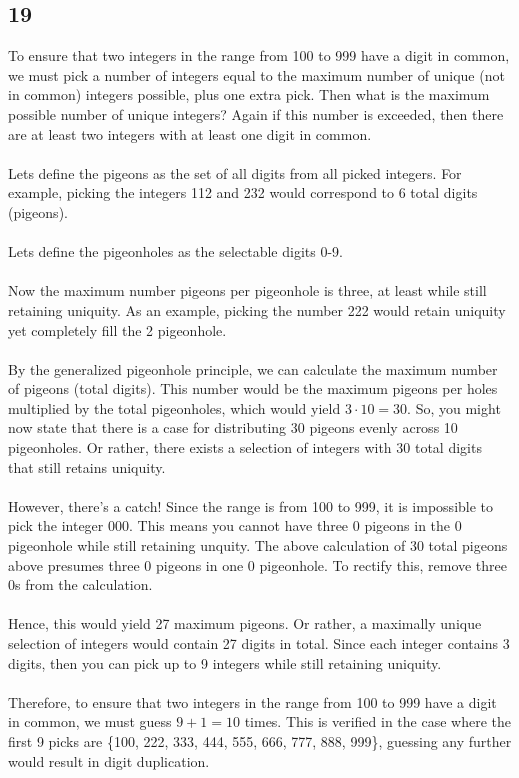\documentclass[12pt]{article}
\begin{document}
\subsection*{19}
To ensure that two integers in the range from 100 to 999 have a digit in common, we must pick a number of integers equal to the maximum number of unique (not in common) integers possible, plus one extra pick. Then what is the maximum possible number of unique integers? Again if this number is exceeded, then there are at least two integers with at least one digit in common. 
\\ \\
Lets define the pigeons as the set of all digits from all picked integers. For example, picking the integers 112 and 232 would correspond to 6 total digits (pigeons).
\\ \\
Lets define the pigeonholes as the selectable digits 0-9.
\\ \\
Now the maximum number pigeons per pigeonhole is three, at least while still retaining uniquity. As an example, picking the number 222 would retain uniquity yet completely fill the 2 pigeonhole.
\\ \\
By the generalized pigeonhole principle, we can calculate the maximum number of pigeons (total digits). This number would be the maximum pigeons per holes multiplied by the total pigeonholes, which would yield $3\cdot10 = 30$. So, you might now state that there is a case for distributing 30 pigeons evenly across 10 pigeonholes. Or rather, there exists a selection of integers with 30 total digits that still retains uniquity.
\\ \\
However, there's a catch! Since the range is from 100 to 999, it is impossible to pick the integer 000. This means you cannot have three 0 pigeons in the 0 pigeonhole while still retaining unquity. The above calculation of 30 total pigeons above presumes three 0 pigeons in one 0 pigeonhole. To rectify this, remove three 0s from the calculation. 
\\ \\
Hence, this would yield 27 maximum pigeons. Or rather, a maximally unique selection of integers would contain 27 digits in total. Since each integer contains 3 digits, then you can pick up to 9 integers while still retaining uniquity. 
\\ \\
Therefore, to ensure that two integers in the range from 100 to 999 have a digit in common, we must guess $9+1=10$ times. This is verified in the case where the first 9 picks are \{100, 222, 333, 444, 555, 666, 777, 888, 999\}, guessing any further would result in digit duplication.
\newpage
\end{document}
